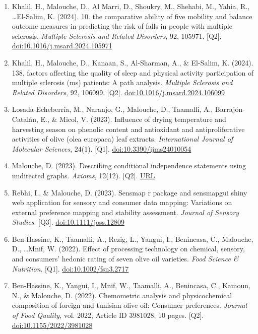 \documentclass[11pt,a4paper,sans]{moderncv}
\begin{document}
\begin{enumerate}
\item Khalil, H., Malouche, D., Al Marri, D., Shoukry, M., Shehabi, M., Yahia, R., \ldots El-Salim, K. (2024). 10. the comparative ability of five mobility and balance outcome measures in predicting the risk of falls in people with multiple sclerosis. \textit{Multiple Sclerosis and Related Disorders}, 92, 105971. [Q2]. \href{https://doi.org/10.1016/j.msard.2024.105971}{doi:10.1016/j.msard.2024.105971}
\item Khalil, H., Malouche, D., Kanaan, S., Al-Sharman, A., \& El-Salim, K. (2024). 138. factors affecting the quality of sleep and physical activity participation of multiple sclerosis (ms) patients: A path analysis. \textit{Multiple Sclerosis and Related Disorders}, 92, 106099. [Q2]. \href{https://doi.org/10.1016/j.msard.2024.106099}{doi:10.1016/j.msard.2024.106099}
\item Losada-Echeberría, M., Naranjo, G., Malouche, D., Taamalli, A., Barrajón-Catalán, E., \& Micol, V. (2023). Influence of drying temperature and harvesting season on phenolic content and antioxidant and antiproliferative activities of olive (olea europaea) leaf extracts. \textit{International Journal of Molecular Sciences}, 24(1). [Q1]. \href{https://doi.org/10.3390/ijms24010054}{doi:10.3390/ijms24010054}
\item Malouche, D. (2023). Describing conditional independence statements using undirected graphs. \textit{Axioms}, 12(12). [Q2]. \href{https://www.mdpi.com/2075-1680/12/12/1109}{URL}
\item Rebhi, I., \& Malouche, D. (2023). Sensmap r package and sensmapgui shiny web application for sensory and consumer data mapping: Variations on external preference mapping and stability assessment. \textit{Journal of Sensory Studies}. [Q3]. \href{http://doi.org/10.1111/joss.12809}{doi:10.1111/joss.12809}
\item Ben-Hassine, K., Taamalli, A., Rezig, L., Yangui, I., Benincasa, C., Malouche, D., \ldots Mnif, W. (2022). Effect of processing technology on chemical, sensory, and consumers' hedonic rating of seven olive oil varieties. \textit{Food Science \& Nutrition}. [Q1]. \href{https://doi.org/10.1002/fsn3.2717}{doi:10.1002/fsn3.2717}
\item Ben-Hassine, K., Yangui, I., Mnif, W., Taamalli, A., Benincasa, C., Kamoun, N., \& Malouche, D. (2022). Chemometric analysis and physicochemical composition of foreign and tunisian olive oil: Consumer preferences. \textit{Journal of Food Quality}, vol. 2022, Article ID 3981028, 10 pages. [Q2]. \href{https://doi.org/10.1155/2022/3981028}{doi:10.1155/2022/3981028}

\end{enumerate}
\end{document}
